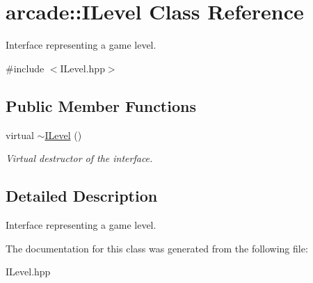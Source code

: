 \hypertarget{classarcade_1_1ILevel}{}\section{arcade\+:\+:I\+Level Class Reference}
\label{classarcade_1_1ILevel}


Interface representing a game level.  




{\ttfamily \#include $<$I\+Level.\+hpp$>$}

\subsection*{Public Member Functions}
\begin{DoxyCompactItemize}
\item 
\mbox{\label{classarcade_1_1ILevel_adfb4fa7604148e972ca51490ce9e5fa6}} 
virtual \hyperlink{classarcade_1_1ILevel_adfb4fa7604148e972ca51490ce9e5fa6}{$\sim$\+I\+Level} ()
\begin{DoxyCompactList}\small\item\em Virtual destructor of the interface. \end{DoxyCompactList}\end{DoxyCompactItemize}


\subsection{Detailed Description}
Interface representing a game level. 

The documentation for this class was generated from the following file\+:\begin{DoxyCompactItemize}
\item 
I\+Level.\+hpp\end{DoxyCompactItemize}
